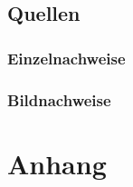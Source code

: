 \documentclass[ngerman, a4paper, justified, nobib, notoc, sfsidenotes]{tufte-book}
\numberwithin{figure}{part}
\numberwithin{table}{part}
\numberwithin{equation}{part}
\numberwithin{mylisting}{part}
\begin{document}
	\chapter{Quellen}\label{ch:sources}
	\section{Einzelnachweise}\label{sec:einzelnachweise}
	\printbibliography[keyword=sources, heading=none, title={}]
	\section{Bildnachweise}\label{sec:bildnachweise}
	\printbibliography[keyword=pictures, heading=none, title={}]
	\nocite{*}
	\thispagestyle{plain}
	
	\appendix
	\part{Anhang}
	
\end{document}

